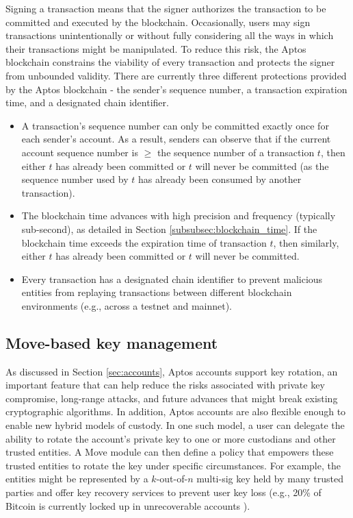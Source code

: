 \documentclass{article}
\begin{document}
Signing a transaction means that the signer authorizes the transaction to be committed and executed by the blockchain. Occasionally, users may sign transactions unintentionally or without fully considering all the ways in which their transactions might be manipulated. To reduce this risk, the Aptos blockchain constrains the viability of every transaction and protects the signer from unbounded validity. There are currently three different protections provided by the Aptos blockchain - the sender's sequence number, a transaction expiration time, and a designated chain identifier.
\begin{itemize}
\item A transaction's sequence number can only be committed exactly once for each sender's account. As a result, senders can observe that if the current account sequence number is $\geq$ the sequence number of a transaction $t$, then either $t$ has already been committed or $t$ will never be committed (as the sequence number used by $t$ has already been consumed by another transaction).
\item The blockchain time advances with high precision and frequency (typically sub-second), as detailed in Section \ref{subsubsec:blockchain_time}. If the blockchain time exceeds the expiration time of transaction $t$, then similarly, either $t$ has already been committed or $t$ will never be committed.
\item Every transaction has a designated chain identifier to prevent malicious entities from replaying transactions between different blockchain environments (e.g., across a testnet and mainnet).
\end{itemize}

\subsection{Move-based key management}

As discussed in Section \ref{sec:accounts}, Aptos accounts support key rotation, an important feature that can help reduce the risks associated with private key compromise, long-range attacks, and future advances that might break existing cryptographic algorithms.  In addition, Aptos accounts are also flexible enough to enable new hybrid models of custody. In one such model, a user can delegate the ability to rotate the account's private key to one or more custodians and other trusted entities. A Move module can then define a policy that empowers these trusted entities to rotate the key under specific circumstances. For example, the entities might be represented by a $k$-out-of-$n$ multi-sig key held by many trusted parties and offer key recovery services to prevent user key loss (e.g., 20\% of Bitcoin is currently locked up in unrecoverable accounts \cite{lost_passwords}). 
\end{document}
